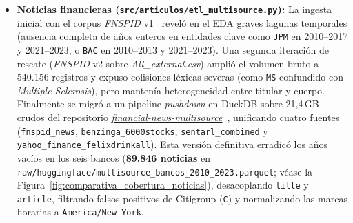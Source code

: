 \begin{itemize}
    \item \textbf{Noticias financieras (\texttt{src/articulos/etl\_multisource.py}):} La ingesta inicial con el corpus \href{https://huggingface.co/datasets/Zihan1004/FNSPID}{\textit{FNSPID}} v1~\cite{dong2024fnspid} reveló en el EDA graves lagunas temporales (ausencia completa de años enteros en entidades clave como \texttt{JPM} en 2010--2017 y 2021--2023, o \texttt{BAC} en 2010--2013 y 2021--2023). Una segunda iteración de rescate (\textit{FNSPID} v2 sobre \textit{All\_external.csv}) amplió el volumen bruto a 540.156 registros y expuso colisiones léxicas severas (como \texttt{MS} confundido con \textit{Multiple Sclerosis}), pero mantenía heterogeneidad entre titular y cuerpo. Finalmente se migró a un pipeline \textit{pushdown} en DuckDB sobre 21,4\,GB crudos del repositorio \href{https://huggingface.co/datasets/Brianferrell787/financial-news-multisource}{\textit{financial-news-multisource}}~\cite{ferrell_multisource}, unificando cuatro fuentes (\texttt{fnspid\_news}, \texttt{benzinga\_6000stocks}, \texttt{sentarl\_combined} y \texttt{yahoo\_finance\_felixdrinkall}). Esta versión definitiva erradicó los años vacíos en los seis bancos (\textbf{89.846 noticias} en \texttt{raw/huggingface/\allowbreak multisource\_bancos\_2010\_2023.parquet}; véase la Figura~\ref{fig:comparativa_cobertura_noticias}), desacoplando \texttt{title} y \texttt{article}, filtrando falsos positivos de Citigroup (\texttt{C}) y normalizando las marcas horarias a \texttt{America/New\_York}.
\end{itemize}

